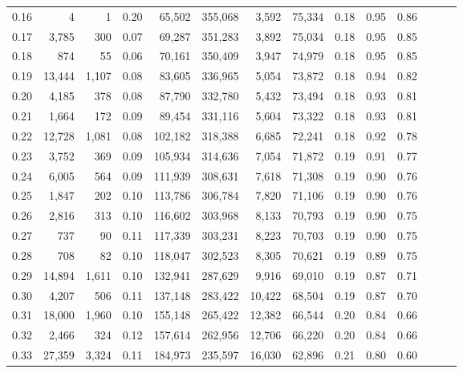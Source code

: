 \begin{tabular}{rrrrrrrrrrrrrr}
0.16 &       4 &      1 &  0.20 &   65,502 &  355,068 &   3,592 &  75,334 &  0.18 &  0.95 &      0.86 \\
0.17 &   3,785 &    300 &  0.07 &   69,287 &  351,283 &   3,892 &  75,034 &  0.18 &  0.95 &      0.85 \\
0.18 &     874 &     55 &  0.06 &   70,161 &  350,409 &   3,947 &  74,979 &  0.18 &  0.95 &      0.85 \\
0.19 &  13,444 &  1,107 &  0.08 &   83,605 &  336,965 &   5,054 &  73,872 &  0.18 &  0.94 &      0.82 \\
0.20 &   4,185 &    378 &  0.08 &   87,790 &  332,780 &   5,432 &  73,494 &  0.18 &  0.93 &      0.81 \\
0.21 &   1,664 &    172 &  0.09 &   89,454 &  331,116 &   5,604 &  73,322 &  0.18 &  0.93 &      0.81 \\
0.22 &  12,728 &  1,081 &  0.08 &  102,182 &  318,388 &   6,685 &  72,241 &  0.18 &  0.92 &      0.78 \\
0.23 &   3,752 &    369 &  0.09 &  105,934 &  314,636 &   7,054 &  71,872 &  0.19 &  0.91 &      0.77 \\
0.24 &   6,005 &    564 &  0.09 &  111,939 &  308,631 &   7,618 &  71,308 &  0.19 &  0.90 &      0.76 \\
0.25 &   1,847 &    202 &  0.10 &  113,786 &  306,784 &   7,820 &  71,106 &  0.19 &  0.90 &      0.76 \\
0.26 &   2,816 &    313 &  0.10 &  116,602 &  303,968 &   8,133 &  70,793 &  0.19 &  0.90 &      0.75 \\
0.27 &     737 &     90 &  0.11 &  117,339 &  303,231 &   8,223 &  70,703 &  0.19 &  0.90 &      0.75 \\
0.28 &     708 &     82 &  0.10 &  118,047 &  302,523 &   8,305 &  70,621 &  0.19 &  0.89 &      0.75 \\
0.29 &  14,894 &  1,611 &  0.10 &  132,941 &  287,629 &   9,916 &  69,010 &  0.19 &  0.87 &      0.71 \\
0.30 &   4,207 &    506 &  0.11 &  137,148 &  283,422 &  10,422 &  68,504 &  0.19 &  0.87 &      0.70 \\
0.31 &  18,000 &  1,960 &  0.10 &  155,148 &  265,422 &  12,382 &  66,544 &  0.20 &  0.84 &      0.66 \\
0.32 &   2,466 &    324 &  0.12 &  157,614 &  262,956 &  12,706 &  66,220 &  0.20 &  0.84 &      0.66 \\
0.33 &  27,359 &  3,324 &  0.11 &  184,973 &  235,597 &  16,030 &  62,896 &  0.21 &  0.80 &      0.60 \\

\end{tabular}
